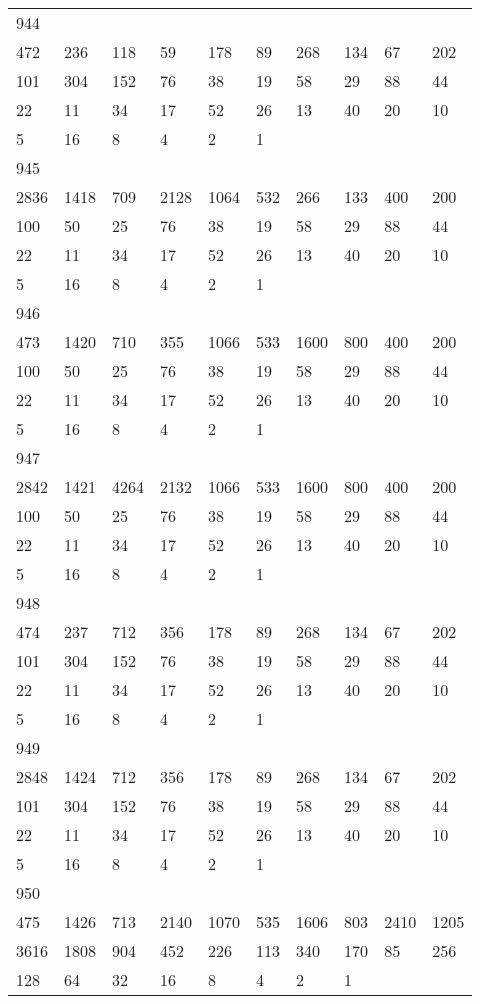 \begin{longtable}{*{10}{l}}
944&&&&&&&&&\\
472& 236& 118& 59& 178& 89& 268& 134& 67& 202\\
101& 304& 152& 76& 38& 19& 58& 29& 88& 44\\
22& 11& 34& 17& 52& 26& 13& 40& 20& 10\\
5& 16& 8& 4& 2& 1& \\

945&&&&&&&&&\\
2836& 1418& 709& 2128& 1064& 532& 266& 133& 400& 200\\
100& 50& 25& 76& 38& 19& 58& 29& 88& 44\\
22& 11& 34& 17& 52& 26& 13& 40& 20& 10\\
5& 16& 8& 4& 2& 1& \\

946&&&&&&&&&\\
473& 1420& 710& 355& 1066& 533& 1600& 800& 400& 200\\
100& 50& 25& 76& 38& 19& 58& 29& 88& 44\\
22& 11& 34& 17& 52& 26& 13& 40& 20& 10\\
5& 16& 8& 4& 2& 1& \\

947&&&&&&&&&\\
2842& 1421& 4264& 2132& 1066& 533& 1600& 800& 400& 200\\
100& 50& 25& 76& 38& 19& 58& 29& 88& 44\\
22& 11& 34& 17& 52& 26& 13& 40& 20& 10\\
5& 16& 8& 4& 2& 1& \\

948&&&&&&&&&\\
474& 237& 712& 356& 178& 89& 268& 134& 67& 202\\
101& 304& 152& 76& 38& 19& 58& 29& 88& 44\\
22& 11& 34& 17& 52& 26& 13& 40& 20& 10\\
5& 16& 8& 4& 2& 1& \\

949&&&&&&&&&\\
2848& 1424& 712& 356& 178& 89& 268& 134& 67& 202\\
101& 304& 152& 76& 38& 19& 58& 29& 88& 44\\
22& 11& 34& 17& 52& 26& 13& 40& 20& 10\\
5& 16& 8& 4& 2& 1& \\

950&&&&&&&&&\\
475& 1426& 713& 2140& 1070& 535& 1606& 803& 2410& 1205\\
3616& 1808& 904& 452& 226& 113& 340& 170& 85& 256\\
128& 64& 32& 16& 8& 4& 2& 1& \\


\end{longtable}
